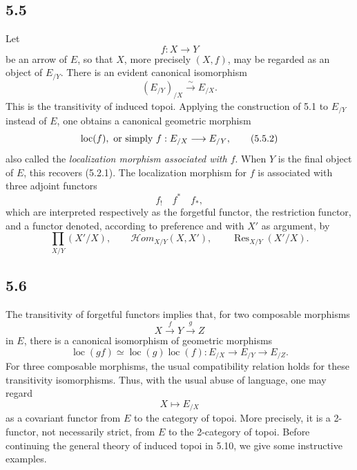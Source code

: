 \documentclass[11pt]{article}
\begin{document}
\subsection*{5.5}
Let
\[
f:X\longrightarrow Y
\]
be an arrow of \(E\), so that \(X\), more precisely \((X,f)\), may be regarded as an object of \(E_{/Y}\). There is an evident canonical isomorphism
\begin{equation*}
(E_{/Y})_{/X}\xrightarrow{\sim}E_{/X}.\tag{5.5.1}
\end{equation*}
This is the transitivity of induced topoi. Applying the construction of 5.1 to \(E_{/Y}\) instead of \(E\), one obtains a canonical geometric morphism
\begin{equation*}
\operatorname{loc}(f),\hbox{ or simply }f:E_{/X}\longrightarrow E_{/Y},\tag{5.5.2}
\end{equation*}
also called the \emph{localization morphism associated with \(f\)}. When \(Y\) is the final object of \(E\), this recovers (5.2.1). The localization morphism for \(f\) is associated with three adjoint functors
\begin{equation*}
f_!\quad f^*\quad f_*,\tag{5.5.3}
\end{equation*}
which are interpreted respectively as the forgetful functor, the restriction functor, and a functor denoted, according to preference and with \(X'\) as argument, by
\[
\prod_{X/Y}(X'/X),\qquad
\mathcal Hom_{X/Y}(X,X'),\qquad
\operatorname{Res}_{X/Y}(X'/X).
\]

\subsection*{5.6}
The transitivity of forgetful functors implies that, for two composable morphisms
\[
X\xrightarrow{f}Y\xrightarrow{g}Z
\]
in \(E\), there is a canonical isomorphism of geometric morphisms
\[
\operatorname{loc}(gf)\simeq \operatorname{loc}(g)\operatorname{loc}(f):
E_{/X}\longrightarrow E_{/Y}\longrightarrow E_{/Z}.
\]
For three composable morphisms, the usual compatibility relation holds for these transitivity isomorphisms. Thus, with the usual abuse of language, one may regard
\[
X\longmapsto E_{/X}
\]
as a covariant functor from \(E\) to the category of topoi. More precisely, it is a 2-functor, not necessarily strict, from \(E\) to the 2-category of topoi. Before continuing the general theory of induced topoi in 5.10, we give some instructive examples.
\end{document}

